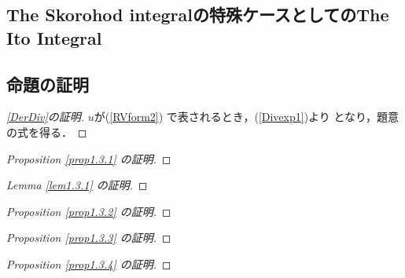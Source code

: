 \begin{definition}
\subsection{The Skorohod integralの特殊ケースとしてのThe Ito Integral}

\subsection{命題の証明}
\begin{proof}[\ref{DerDiv}の証明]
$u$が(\ref{RVform2}) で表されるとき，(\ref{Divexp1})より
となり，題意の式を得る．
\end{proof}
\begin{proof}[Proposition \ref{prop1.3.1} の証明]
\end{proof}
\begin{proof}[Lemma \ref{lem1.3.1} の証明]
\end{proof}
\begin{proof}[Proposition \ref{prop1.3.2} の証明]
\end{proof}
\begin{proof}[Proposition \ref{prop1.3.3} の証明]
\end{proof}
\begin{proof}[Proposition \ref{prop1.3.4} の証明]
\end{proof}



\end{definition}